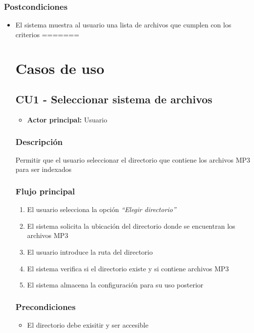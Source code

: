 \subsubsection*{Postcondiciones}
\begin{itemize}
  \item El sistema muestra al usuario una lista de archivos que cumplen con los criterios
=======

\section*{Casos de uso}

\subsection*{CU1 - Seleccionar sistema de archivos}
\begin{itemize}
  \item \textbf{Actor principal:} Usuario
\end{itemize}

\subsubsection*{Descripción}
Permitir que el usuario seleccionar el directorio que contiene los archivos MP3 
para ser indexados

\subsubsection*{Flujo principal}
\begin{enumerate}
  \item El usuario selecciona la opción \textit{\textquotedblleft Elegir directorio\textquotedblright}
  \item El sistema solicita la ubicación del directorio donde se encuentran los
  archivos MP3
  \item El usuario introduce la ruta del directorio
  \item El sistema verifica si el directorio existe y si contiene archivos MP3
  \item El sistema almacena la configuración para su uso posterior
\end{enumerate}

\subsubsection*{Precondiciones}
\begin{itemize}
  \item El directorio debe exisitir y ser accesible
\end{itemize}


\end{itemize}
